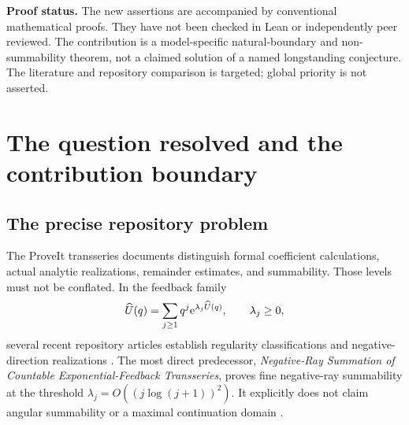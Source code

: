 \documentclass[11pt,a4paper]{article}
\numberwithin{equation}{section}
\theoremstyle{definition}\newtheorem{definition}[theorem]{Definition}
\theoremstyle{remark}\newtheorem{remark}[theorem]{Remark}
\theoremstyle{definition}
\newcommand{\Uhat}{\widehat U}\newcommand{\Qhat}{\widehat Q}
\begin{document}
\begin{titlepage}
\begin{minipage}{0.94\textwidth}
\begin{abstract}
For $d=2$, this resolves the angular-continuation question left open in the
repository's negative-ray summation article: both inverse and forward formal
series are finely Borel summable on the negative ray, but neither is
Borel summable in any open angular neighborhood of that direction. In
particular, an entire Borel transform does not supply an angular summation
sector. We also give convergent exponential blocks, uniform closed-half-disc
remainders for every $d\ge2$, an explicit optimized error scale, finite
verification programs, and further research questions.
\end{abstract}
\end{minipage}
\vfill
\begin{minipage}{0.94\textwidth}\small
\textbf{Proof status.} The new assertions are accompanied by conventional
mathematical proofs. They have not been checked in Lean or independently peer
reviewed. The contribution is a model-specific natural-boundary and
non-summability theorem, not a claimed solution of a named longstanding
conjecture. The literature and repository comparison is targeted; global
priority is not asserted.
\end{minipage}
\end{titlepage}
\hypersetup{pageanchor=true}
\setcounter{tocdepth}{2}\tableofcontents\clearpage

\section{The question resolved and the contribution boundary}
\label{sec:context}
\subsection{The precise repository problem}
The ProveIt transseries documents distinguish formal coefficient calculations,
actual analytic realizations, remainder estimates, and summability. Those
levels must not be conflated. In the feedback family
\begin{equation}
 \Uhat(q)=\sum_{j\ge1}q^j\e^{\lambda_j\Uhat(q)},\qquad \lambda_j\ge0,
 \label{eq:general-feedback}
\end{equation}
several recent repository articles establish regularity classifications and
negative-direction realizations \cite{repo-reg,repo-sector,repo-fine}.
The most direct predecessor, \emph{Negative-Ray Summation of Countable
Exponential-Feedback Transseries}, proves fine negative-ray summability at the
threshold $\lambda_j=O((j\log(j+1))^2)$. It explicitly does not claim angular
summability or a maximal continuation domain \cite{repo-fine}.
\end{document}
